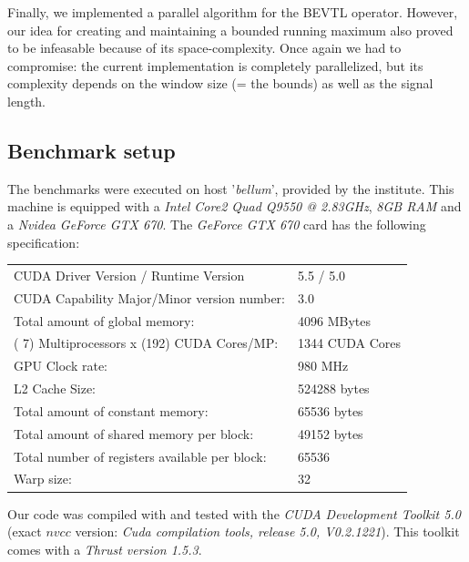 \documentclass[a4paper,10pt]{article}
\begin{document}
Finally, we implemented a parallel algorithm for the BEVTL operator. However,
our idea for creating and maintaining a bounded running maximum also proved to
be infeasable because of its space-complexity. Once again we had to compromise:
the current implementation is completely parallelized, but its complexity depends
on the window size (= the bounds) as well as the signal length.


\subsection{Benchmark setup}

The benchmarks were executed on host '{\it bellum}', provided by the institute. This machine is equipped with a {\it Intel Core2 Quad Q9550 @ 2.83GHz}, {\it 8GB RAM} and a {\it Nvidea GeForce GTX 670}. The {\it GeForce GTX 670} card has the following specification:

\begin{center}
	\begin{tabular}{ll}
      CUDA Driver Version / Runtime Version          & 5.5 / 5.0 \\
      CUDA Capability Major/Minor version number:    & 3.0 \\
      Total amount of global memory:                 & 4096 MBytes \\
      ( 7) Multiprocessors x (192) CUDA Cores/MP:    & 1344 CUDA Cores \\
      GPU Clock rate:                                & 980 MHz \\
      L2 Cache Size:                                 & 524288 bytes\\
      Total amount of constant memory:               & 65536 bytes \\
      Total amount of shared memory per block:       & 49152 bytes \\
      Total number of registers available per block: & 65536 \\
      Warp size:                                     & 32 \\
	\end{tabular}
	\label{tab: GPU specifications}
\end{center}

Our code was compiled with and tested with the {\it CUDA Development Toolkit 5.0} (exact $nvcc$ version: {\it Cuda compilation tools, release 5.0, V0.2.1221}). This toolkit comes with a {\it Thrust version 1.5.3}.
\end{document}
